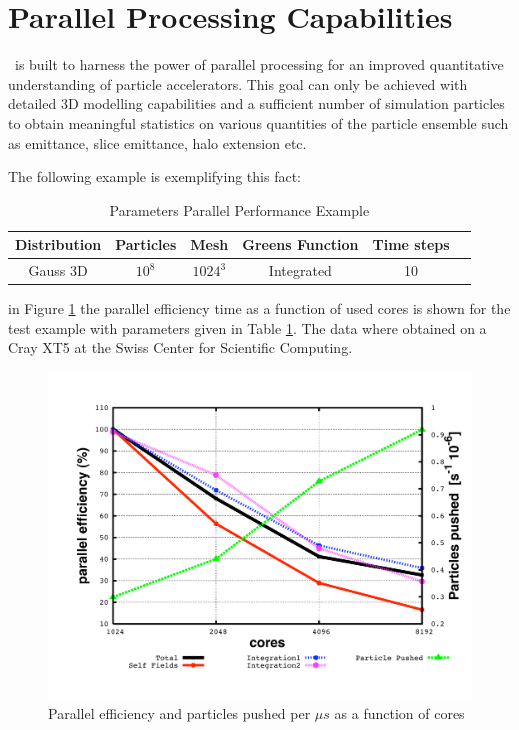 \section{Parallel Processing Capabilities}
\opal\ is built to harness the power of parallel processing for an improved quantitative understanding
of particle accelerators.
This goal can only be achieved with
detailed 3D modelling capabilities and a sufficient number of simulation particles to obtain meaningful statistics on various 
quantities of the particle ensemble such as emittance, slice emittance, halo extension etc. 

The following example is exemplifying this fact: 
\begin{table}[ht] \footnotesize
  \begin{center}
    \caption{Parameters Parallel Performance Example}
    \label{tab:pex1} 
    \begin{tabular}{c c c c c c} 
      \hline
      \hline 
      Distribution & Particles  & Mesh & Greens Function & Time steps  \\ [0.75ex] 
      \hline 
      Gauss 3D & $10^8$ & $1024^3$ & Integrated  & 10 \\ [1ex] 
      \hline
    \end{tabular}
  \end{center}
\end{table}
in Figure \ref{fig:walldrift} the parallel efficiency time as a function of used cores is shown for the test example with parameters given in Table \ref{tab:pex1}.  The data where obtained on a Cray XT5 at the
Swiss Center for Scientific Computing.
\begin{figure}[ht]
 \begin{center}
 \includegraphics[width=0.50\linewidth,angle=0]{figures/drift2c1}
  \caption{Parallel efficiency and particles pushed per $\mu s$ as a function of cores}
  \label{fig:walldrift}
 \end{center}
\end{figure}
\clearpage
